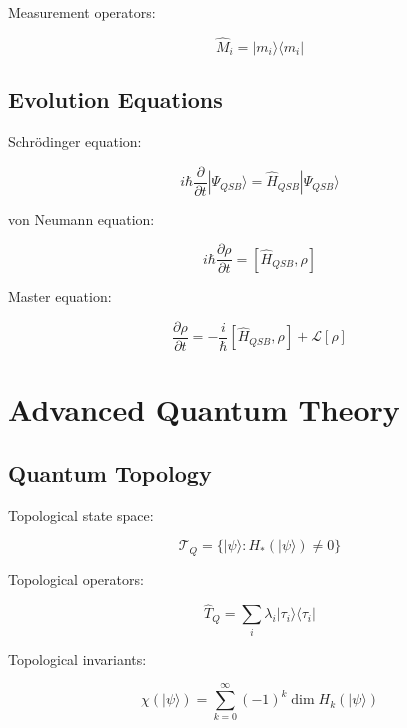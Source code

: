 \documentclass[12pt]{article}
\begin{document}
Measurement operators:

\begin{equation}
\hat{M}_i = |m_i\rangle\langle m_i|
\end{equation}

\subsection{Evolution Equations}

Schrödinger equation:

\begin{equation}
i\hbar\frac{\partial}{\partial t}|\Psi_{QSB}\rangle = \hat{H}_{QSB}|\Psi_{QSB}\rangle
\end{equation}

von Neumann equation:

\begin{equation}
i\hbar\frac{\partial\rho}{\partial t} = [\hat{H}_{QSB}, \rho]
\end{equation}

Master equation:

\begin{equation}
\frac{\partial\rho}{\partial t} = -\frac{i}{\hbar}[\hat{H}_{QSB}, \rho] + \mathcal{L}[\rho]
\end{equation}

\section{Advanced Quantum Theory}

\subsection{Quantum Topology}

Topological state space:

\begin{equation}
\mathcal{T}_Q = \{|\psi\rangle : H_*(|\psi\rangle) \neq 0\}
\end{equation}

Topological operators:

\begin{equation}
\hat{T}_Q = \sum_i \lambda_i|\tau_i\rangle\langle\tau_i|
\end{equation}

Topological invariants:

\begin{equation}
\chi(|\psi\rangle) = \sum_{k=0}^{\infty} (-1)^k \dim H_k(|\psi\rangle)
\end{equation}
\end{document}
